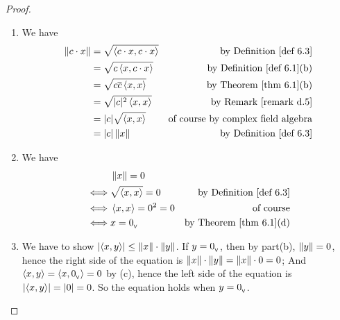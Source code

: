 \begin{proof} \ 

\begin{enumerate}
\item We have
\begin{align*}
    \norm{c \cdot x} & = \sqrt{\LG c \cdot x, c \cdot x \RG} & \text{by \DEF{6.3}} \\
        & = \sqrt{c \LG x, c \cdot x \RG} & \text{by \DEF{6.1}(b)} \\
        & = \sqrt{c \conjugatet{c} \LG x, x \RG} & \text{by \THM{6.1}(b)} \\
        & = \sqrt{\abs{c}^2 \LG x, x \RG} & \text{by \RMK{d.5}} \\
        & = \abs{c} \sqrt{\LG x, x \RG} & \text{of course by complex field algebra} \\
        & = \abs{c} \norm{x} & \text{by \DEF{6.3}}
\end{align*}

\item We have
\begin{align*}
         & \norm{x} = 0 \\
    \iff & \sqrt{\LG x, x \RG} = 0 & \text{by \DEF{6.3}} \\
    \iff & \LG x, x \RG = 0^2 = 0 & \text{of course} \\
    \iff & x = \OV & \text{by \THM{6.1}(d)}
\end{align*}

\item We have to show \(\lvert\left< x, y \right>\rvert \le \left\lVert x\right\rVert \cdot \left\lVert y\right\rVert\).
If \(y = 0_{_{\textsf{V}}}\), then by part(b), \(\left\lVert y\right\rVert = 0\), hence the right side of the equation is \(\left\lVert x\right\rVert \cdot \left\lVert y\right\rVert = \left\lVert x\right\rVert \cdot 0 = 0\);
And \(\left< x, y \right> = \left< x, 0_{_{\textsf{V}}} \right> = 0\) by (c), hence the left side of the equation is \(\lvert\left< x, y \right>\rvert = \lvert0\rvert = 0\).
So the equation holds when \(y = 0_{_{\textsf{V}}}\).


\end{enumerate}
\end{proof}
